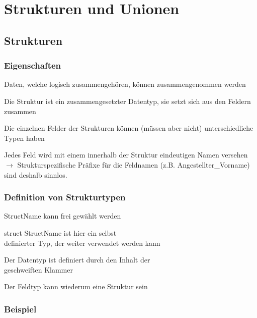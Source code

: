 \section{Strukturen und Unionen}
	\subsection{Strukturen}
		\subsubsection{Eigenschaften}
			\begin{compactitem}
				\item Daten, welche logisch zusammengehören, können zusammengenommen werden
				\item Die Struktur ist ein zusammengesetzter Datentyp, sie setzt sich aus den Feldern zusammen
				\item Die einzelnen Felder der Strukturen können (müssen aber nicht) unterschiedliche Typen haben
				\item Jedes Feld wird mit einem innerhalb der Struktur eindeutigen Namen versehen $\rightarrow$ Strukturspezifische Präfixe für die Feldnamen (z.B. Angestellter\_Vorname) sind deshalb sinnlos. 
			\end{compactitem}
		
	\begin{minipage}[t]{10 cm}
		\subsubsection{Definition von Strukturtypen}
			\vspace*{-0.2cm}
			
			\vspace*{0.3cm}
			\begin{compactitem}
				\item StructName kann frei gewählt werden
				\item struct StructName ist hier ein selbst\\ definierter Typ, der weiter verwendet werden kann
				\item Der Datentyp ist definiert durch den Inhalt der\\ geschweiften Klammer
				\item Der Feldtyp kann wiederum eine Struktur sein
			\end{compactitem}
	\end{minipage}
		\hspace*{0.5cm}	
	\begin{minipage}[t]{8 cm}
		\subsubsection{Beispiel}
			\vspace*{-0.2cm}
			
	\end{minipage}
	
